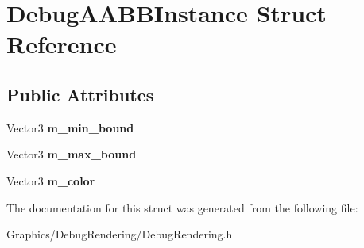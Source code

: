 \hypertarget{structDebugAABBInstance}{}\section{Debug\+A\+A\+B\+B\+Instance Struct Reference}
\label{structDebugAABBInstance}
\subsection*{Public Attributes}
\begin{DoxyCompactItemize}
\item 
\mbox{\label{structDebugAABBInstance_a70c7226d27e3102495319048155b0e82}} 
Vector3 {\bfseries m\+\_\+min\+\_\+bound}
\item 
\mbox{\label{structDebugAABBInstance_a047247555ac7f24886e8beb075959ec3}} 
Vector3 {\bfseries m\+\_\+max\+\_\+bound}
\item 
\mbox{\label{structDebugAABBInstance_abf825faaf4d681142ed7ce2e86fb7d7e}} 
Vector3 {\bfseries m\+\_\+color}
\end{DoxyCompactItemize}


The documentation for this struct was generated from the following file\+:\begin{DoxyCompactItemize}
\item 
Graphics/\+Debug\+Rendering/Debug\+Rendering.\+h\end{DoxyCompactItemize}
